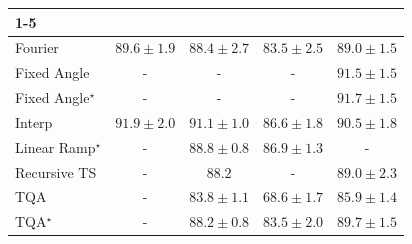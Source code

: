 \begin{tabular}{l|cccc|}
\cline{1-5}
\multicolumn{5}{c}{\rule{0pt}{8pt}PP} \\
\midrule
Fourier & {\cellcolor[HTML]{12763D}} \color[HTML]{F1F1F1} $89.6\pm 1.9$ & {\cellcolor[HTML]{1C7E40}} \color[HTML]{F1F1F1} $88.4\pm 2.7$ & {\cellcolor[HTML]{45AD5F}} \color[HTML]{F1F1F1} $83.5\pm 2.5$ & {\cellcolor[HTML]{177B3F}} \color[HTML]{F1F1F1} $89.0\pm 1.5$ \\
Fixed Angle & {\cellcolor[HTML]{000000}} \color[HTML]{F1F1F1} {\cellcolor{white}} \color{black} - & {\cellcolor[HTML]{000000}} \color[HTML]{F1F1F1} {\cellcolor{white}} \color{black} - & {\cellcolor[HTML]{000000}} \color[HTML]{F1F1F1} {\cellcolor{white}} \color{black} - & {\cellcolor[HTML]{006837}} \color[HTML]{F1F1F1} $91.5\pm 1.5$ \\
Fixed Angle$^\star$ & {\cellcolor[HTML]{000000}} \color[HTML]{F1F1F1} {\cellcolor{white}} \color{black} - & {\cellcolor[HTML]{000000}} \color[HTML]{F1F1F1} {\cellcolor{white}} \color{black} - & {\cellcolor[HTML]{000000}} \color[HTML]{F1F1F1} {\cellcolor{white}} \color{black} - & {\cellcolor[HTML]{006636}} \color[HTML]{F1F1F1} $91.7\pm 1.5$ \\
Interp & {\cellcolor[HTML]{006435}} \color[HTML]{F1F1F1} $91.9\pm 2.0$ & {\cellcolor[HTML]{036B38}} \color[HTML]{F1F1F1} $91.1\pm 1.0$ & {\cellcolor[HTML]{2B8E4A}} \color[HTML]{F1F1F1} $86.6\pm 1.8$ & {\cellcolor[HTML]{096F3A}} \color[HTML]{F1F1F1} $90.5\pm 1.8$ \\
Linear Ramp$^\star$ & {\cellcolor[HTML]{000000}} \color[HTML]{F1F1F1} {\cellcolor{white}} \color{black} - & {\cellcolor[HTML]{187B3F}} \color[HTML]{F1F1F1} $88.8\pm 0.8$ & {\cellcolor[HTML]{298C48}} \color[HTML]{F1F1F1} $86.9\pm 1.3$ & {\cellcolor[HTML]{000000}} \color[HTML]{F1F1F1} {\cellcolor{white}} \color{black} - \\
Recursive TS & {\cellcolor[HTML]{000000}} \color[HTML]{F1F1F1} {\cellcolor{white}} \color{black} - & {\cellcolor[HTML]{1E8041}} \color[HTML]{F1F1F1} $88.2$ & {\cellcolor[HTML]{000000}} \color[HTML]{F1F1F1} {\cellcolor{white}} \color{black} - & {\cellcolor[HTML]{177B3F}} \color[HTML]{F1F1F1} $89.0\pm 2.3$ \\
TQA & {\cellcolor[HTML]{000000}} \color[HTML]{F1F1F1} {\cellcolor{white}} \color{black} - & {\cellcolor[HTML]{42AB5D}} \color[HTML]{F1F1F1} $83.8\pm 1.1$ & {\cellcolor[HTML]{F6FCB8}} \color[HTML]{000000} $68.6\pm 1.7$ & {\cellcolor[HTML]{30954F}} \color[HTML]{F1F1F1} $85.9\pm 1.4$ \\
TQA$^\star$ & {\cellcolor[HTML]{000000}} \color[HTML]{F1F1F1} {\cellcolor{white}} \color{black} - & {\cellcolor[HTML]{1E8041}} \color[HTML]{F1F1F1} $88.2\pm 0.8$ & {\cellcolor[HTML]{45AD5F}} \color[HTML]{F1F1F1} $83.5\pm 2.0$ & {\cellcolor[HTML]{11753D}} \color[HTML]{F1F1F1} $89.7\pm 1.5$ \\

\end{tabular}
